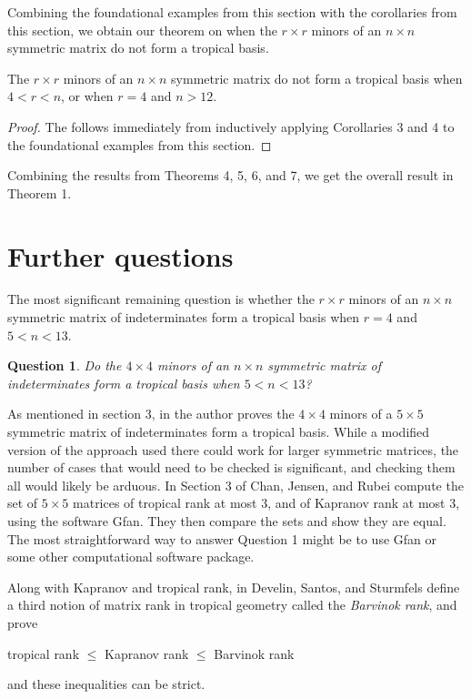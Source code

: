 \documentclass{article}
\begin{document}
Combining the foundational examples from this section with the corollaries from this section, we obtain our theorem on when the $r \times r$ minors of an $n \times n$ symmetric matrix do not form a tropical basis.

\begin{thm}
  The $r \times r$ minors of an $n \times n$ symmetric matrix do not form a tropical basis when $4 < r < n$, or when $r = 4$ and $n > 12$.
\end{thm}

\begin{proof}
The follows immediately from inductively applying Corollaries 3 and 4 to the foundational examples from this section.
\end{proof}

Combining the results from Theorems 4, 5, 6, and 7, we get the overall result in Theorem 1.

\section{Further questions}

The most significant remaining question is whether the $r \times r$ minors of an $n \times n$ symmetric matrix of indeterminates form a tropical basis when $r = 4$ and $5 < n < 13$.

\newtheorem{question}{Question}
\begin{question}
  Do the $4 \times 4$ minors of an $n \times n$ symmetric matrix of indeterminates form a tropical basis when $5 < n < 13$?
\end{question}

As mentioned in section 3, in \cite{z} the author proves the $4 \times 4$ minors of a $5 \times 5$ symmetric matrix of indeterminates form a tropical basis. While a modified version of the approach used there could work for larger symmetric matrices, the number of cases that would need to be checked is significant, and checking them all would likely be arduous. In Section 3 of \cite{cjr} Chan, Jensen, and Rubei compute the set of $5 \times 5$ matrices of tropical rank at most 3, and of Kapranov rank at most 3, using the software Gfan. They then compare the sets and show they are equal. The most straightforward way to answer Question 1 might be to use Gfan or some other computational software package.

Along with Kapranov and tropical rank, in \cite{dss} Develin, Santos, and Sturmfels define a third notion of matrix rank in tropical geometry called the \emph{Barvinok rank}, and prove
\begin{center}
  tropical rank $\leq$ Kapranov rank $\leq$ Barvinok rank
\end{center}
and these inequalities can be strict.
\end{document}
